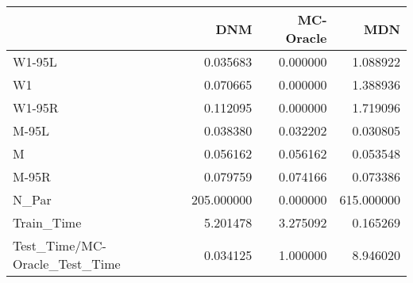 \begin{tabular}{lrrr}
\toprule
{} &         DNM &  MC-Oracle &         MDN \\
\midrule
W1-95L                        &    0.035683 &   0.000000 &    1.088922 \\
W1                            &    0.070665 &   0.000000 &    1.388936 \\
W1-95R                        &    0.112095 &   0.000000 &    1.719096 \\
M-95L                         &    0.038380 &   0.032202 &    0.030805 \\
M                             &    0.056162 &   0.056162 &    0.053548 \\
M-95R                         &    0.079759 &   0.074166 &    0.073386 \\
N\_Par                         &  205.000000 &   0.000000 &  615.000000 \\
Train\_Time                    &    5.201478 &   3.275092 &    0.165269 \\
Test\_Time/MC-Oracle\_Test\_Time &    0.034125 &   1.000000 &    8.946020 \\
\bottomrule
\end{tabular}
